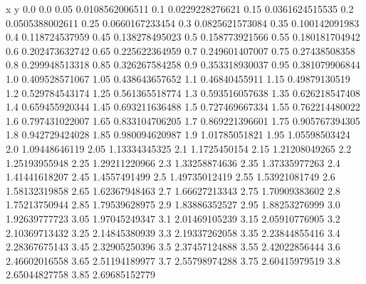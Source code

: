               x                y
            0.0              0.0
           0.05  0.0108562006511
            0.1  0.0229228276621
           0.15  0.0361624515535
            0.2  0.0505388002611
           0.25  0.0660167233454
            0.3  0.0825621573084
           0.35   0.100142091983
            0.4   0.118724537959
           0.45   0.138278495023
            0.5   0.158773921566
           0.55   0.180181704942
            0.6   0.202473632742
           0.65   0.225622364959
            0.7   0.249601407007
           0.75    0.27438508358
            0.8   0.299948513318
           0.85   0.326267584258
            0.9   0.353318930037
           0.95   0.381079906844
            1.0   0.409528571067
           1.05   0.438643657652
            1.1    0.46840455911
           1.15    0.49879130519
            1.2   0.529784543174
           1.25   0.561365518774
            1.3   0.593516057638
           1.35   0.626218547408
            1.4   0.659455920344
           1.45   0.693211636488
            1.5   0.727469667334
           1.55   0.762214480022
            1.6   0.797431022007
           1.65   0.833104706205
            1.7   0.869221396601
           1.75   0.905767394305
            1.8   0.942729424028
           1.85   0.980094620987
            1.9    1.01785051821
           1.95    1.05598503424
            2.0    1.09448646119
           2.05    1.13334345325
            2.1     1.1725450154
           2.15    1.21208049265
            2.2    1.25193955948
           2.25    1.29211220966
            2.3    1.33258874636
           2.35    1.37335977263
            2.4    1.41441618207
           2.45     1.4557491499
            2.5    1.49735012419
           2.55    1.53921081749
            2.6    1.58132319858
           2.65    1.62367948463
            2.7    1.66627213343
           2.75    1.70909383602
            2.8    1.75213750944
           2.85    1.79539628975
            2.9    1.83886352527
           2.95    1.88253276999
            3.0    1.92639777723
           3.05    1.97045249347
            3.1    2.01469105239
           3.15    2.05910776905
            3.2    2.10369713432
           3.25    2.14845380939
            3.3    2.19337262058
           3.35    2.23844855416
            3.4    2.28367675143
           3.45    2.32905250396
            3.5    2.37457124888
           3.55    2.42022856444
            3.6    2.46602016558
           3.65    2.51194189977
            3.7    2.55798974288
           3.75    2.60415979519
            3.8    2.65044827758
           3.85    2.69685152779
